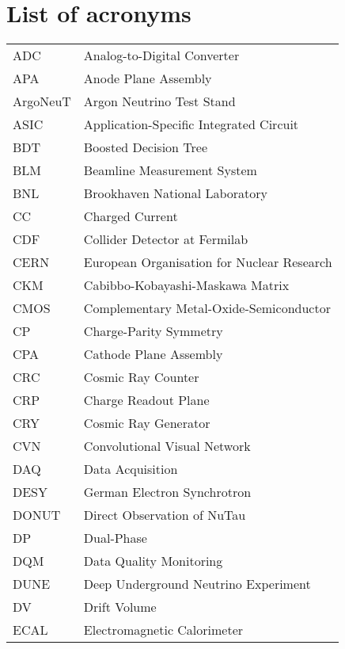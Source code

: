 
\chapter*{List of acronyms}

\begin{longtable}{l p{11cm}}
ADC         & Analog-to-Digital Converter \\
APA         & Anode Plane Assembly \\
ArgoNeuT    & Argon Neutrino Test Stand \\
ASIC        & Application-Specific Integrated Circuit \\
BDT         & Boosted Decision Tree \\
BLM         & Beamline Measurement System \\
BNL         & Brookhaven National Laboratory \\
CC          & Charged Current \\
CDF         & Collider Detector at Fermilab \\
CERN        & European Organisation for Nuclear Research \\
CKM         & Cabibbo-Kobayashi-Maskawa Matrix \\
CMOS        & Complementary Metal-Oxide-Semiconductor \\
CP          & Charge-Parity Symmetry \\
CPA         & Cathode Plane Assembly \\
CRC         & Cosmic Ray Counter \\
CRP         & Charge Readout Plane \\
CRY         & Cosmic Ray Generator \\
CVN         & Convolutional Visual Network \\
DAQ         & Data Acquisition \\
DESY        & German Electron Synchrotron \\
DONUT       & Direct Observation of NuTau \\
DP          & Dual-Phase \\
DQM         & Data Quality Monitoring \\
DUNE        & Deep Underground Neutrino Experiment \\
DV          & Drift Volume \\
ECAL        & Electromagnetic Calorimeter \\

\end{longtable}
